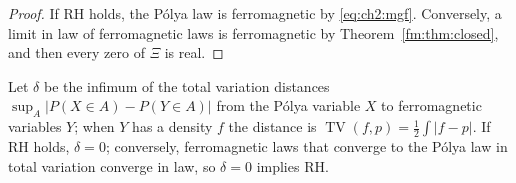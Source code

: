 \begin{proof}
If RH holds, the P\'olya law is ferromagnetic by \eqref{eq:ch2:mgf}. Conversely, a limit in law of ferromagnetic laws is ferromagnetic by Theorem~\ref{fm:thm:closed}, and then every zero of $\Xi$ is real.
\end{proof}

Let $\delta$ be the infimum of the total variation distances $\sup_A|P(X\in A)-P(Y\in A)|$ from the P\'olya variable $X$ to ferromagnetic variables $Y$; when $Y$ has a density $f$ the distance is $\operatorname{TV}(f,p)=\frac12\int|f-p|$. If RH holds, $\delta=0$; conversely, ferromagnetic laws that converge to the P\'olya law in total variation converge in law, so $\delta=0$ implies RH.
